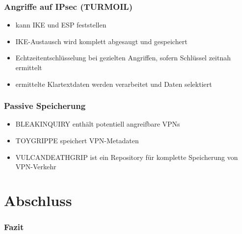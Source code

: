 \documentclass[t]{beamer}
\begin{document}
{

}

\begin{frame}
	\frametitle{Angriffe auf IPsec (TURMOIL)}
	\begin{itemize}
		\item kann IKE und ESP feststellen
		\item IKE-Austausch wird komplett abgesaugt und gespeichert
		\item Echtzeitentschlüsselung bei gezielten Angriffen, sofern Schlüssel zeitnah ermittelt
		\item ermittelte Klartextdaten werden verarbeitet und Daten selektiert
	\end{itemize}
\end{frame}

\begin{frame}
	\frametitle{Passive Speicherung}
	\begin{itemize}
		\item BLEAKINQUIRY enthält potentiell angreifbare VPNs
		\item TOYGRIPPE speichert VPN-Metadaten
		\item VULCANDEATHGRIP ist ein Repository für komplette Speicherung von VPN-Verkehr
	\end{itemize}
\end{frame}

\section{Abschluss}
\begin{frame}
	\frametitle{Fazit}
\end{frame}
\end{document}
